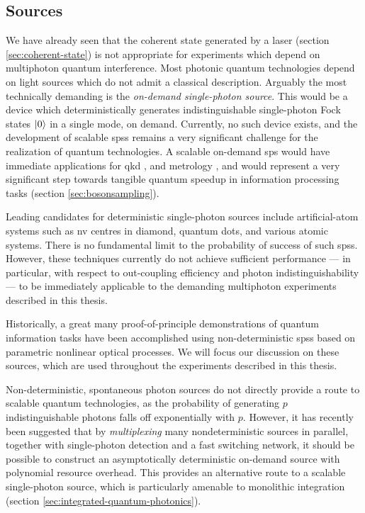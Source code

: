 \subsection{Sources} 
\label{sec:sources}
We have already seen that the coherent state generated by a laser (section \ref{sec:coherent-state}) is not appropriate for experiments which depend on multiphoton quantum interference. Most photonic quantum technologies depend on light sources which do not admit a classical description. Arguably the most technically demanding is the \emph{on-demand single-photon source}. This would be a device which deterministically generates indistinguishable single-photon Fock states $\mbox{$ | 0 \rangle $}$ in a single mode, on demand. Currently, no such device exists, and the development of scalable \glspl{sps} remains a very significant challenge for the realization of quantum technologies. A scalable on-demand \gls{sps} would have immediate applications for \gls{qkd} \cite{Horikiri2005}, and metrology \cite{Matthews2013d}, and would represent a very significant step towards tangible quantum speedup in information processing tasks (section \ref{sec:bosonsampling}).

Leading candidates for deterministic single-photon sources include artificial-atom systems \cite{Eisaman2011} such as \gls{nv} centres in diamond, quantum dots, and various atomic systems. There is no fundamental limit to the probability of success of such \glspl{sps}. However, these techniques currently do not achieve sufficient performance --- in particular, with respect to out-coupling efficiency and photon indistinguishability --- to be immediately applicable to the demanding multiphoton experiments described in this thesis. 

Historically, a great many proof-of-principle demonstrations of quantum information tasks have been accomplished using non-deterministic \glspl{sps} based on parametric nonlinear optical processes. We will focus our discussion on these sources, which are used throughout the experiments described in this thesis.

Non-deterministic, spontaneous photon sources do not directly provide a route to scalable quantum technologies, as the probability of generating $p$ indistinguishable photons falls off exponentially with $p$. However, it has recently been suggested \cite{Collins2013, Jeffrey2004} that by \emph{multiplexing} many nondeterministic sources in parallel, together with single-photon detection and a fast switching network, it should be possible to construct an asymptotically deterministic on-demand source with polynomial resource overhead. This provides an alternative route to a scalable single-photon source, which is particularly amenable to monolithic integration (section \ref{sec:integrated-quantum-photonics}).

